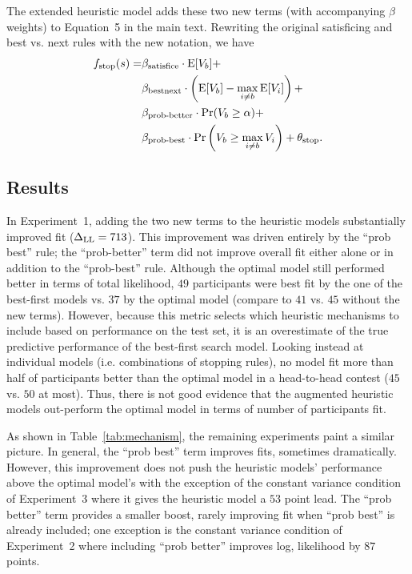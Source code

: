 The extended heuristic model adds these two new terms (with accompanying $\beta$ weights) to Equation~5 in the main text. Rewriting the original satisficing and best vs. next rules with the new notation, we have
%
\begin{equation}
\begin{aligned}
f_{\mathrm{stop}}(s) = 
  &\beta_{\text{satisfice}}\cdot \operatorname*{E}[V_{b}] +\\
  &\beta_{\text{bestnext}}\cdot \left(\operatorname*{E}[V_{b}] - \max_{i \neq b}\operatorname*{E}[V_i]\right) +\\
  &\beta_{\text{prob-better}}\cdot\Pr(V_{b} \geq \alpha) +\\
  &\beta_{\text{prob-best}}\cdot \Pr\left(V_{b} \geq \max_{i \neq b} V_i\right) +
  \theta_{\mathrm{stop}}.
\end{aligned}
\end{equation}
%

\subsection{Results}
In Experiment~1, adding the two new terms to the heuristic models substantially improved fit ($\Delta_{\mathrm{LL}} = 713$). This improvement was driven entirely by the ``prob best'' rule; the ``prob-better'' term did not improve overall fit either alone or in addition to the ``prob-best'' rule. Although the optimal model still performed better in terms of total likelihood, $49$ participants were best fit by the one of the best-first models vs. $37$ by the optimal model (compare to $41$ vs. $45$ without the new terms). However, because this metric selects which heuristic mechanisms to include based on performance on the test set, it is an overestimate of the true predictive performance of the best-first search model. Looking instead at individual models (i.e. combinations of stopping rules), no model fit more than half of participants better than the optimal model in a head-to-head contest ($45$ vs. $50$ at most). Thus, there is not good evidence that the augmented heuristic models out-perform the optimal model in terms of number of participants fit.

As shown in Table~\ref{tab:mechanism}, the remaining experiments paint a similar picture. In general, the ``prob best'' term improves fits, sometimes dramatically. However, this improvement does not push the heuristic models' performance above the optimal model's with the exception of the constant variance condition of Experiment~3 where it gives the heuristic model a $53$ point lead. The ``prob better'' term provides a smaller boost, rarely improving fit when ``prob best'' is already included; one exception is the constant variance condition of Experiment~2 where including ``prob better'' improves log, likelihood by $87$ points.

